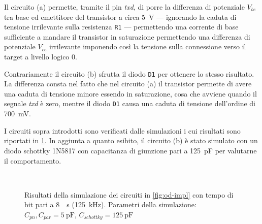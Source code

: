 Il circuito (a) permette, tramite il pin \textit{txd}, di porre la differenza di potenziale \(V_{be}\) tra base ed emettitore del transistor a circa \SI{5}{\volt} --- ignorando la caduta di tensione irrilevante sulla resistenza \texttt{R1} --- permettendo una corrente di base sufficiente a mandare il transistor in saturazione permettendo una differenza di potenziale \(V_{ce}\) irrilevante imponendo così la tensione sulla connessione verso il target a livello logico 0.

Contrariamente il circuito (b) sfrutta il diodo \texttt{D1} per ottenere lo stesso risultato. La differenza consta nel fatto che nel circuito (a) il transistor permette di avere una caduta di tensione minore essendo in saturazione, cosa che avviene quando il segnale \textit{txd} è zero, mentre il diodo \texttt{D1} causa una caduta di tensione dell'ordine di \SI{700}{\milli\volt}.

I circuiti sopra introdotti sono verificati dalle simulazioni i cui risultati sono riportati in \cref{graph:sim}. In aggiunta a quanto esibito, il circuito (b) è stato simulato con un diodo schottky 1N5817 con capacitanza di giunzione pari a \SI{125}{\pico\farad} per valutarne il comportamento.

\begin{figure}
    \centering
        \\
        \vfill
    \caption[]{Risultati della simulazione dei circuiti in \cref{fig:od-impl} con tempo di bit pari a \SI{8}{\text{\mu}\second} (\SI{125}{\kilo\hertz}). Parametri della simulazione: \(C_{pn}, C_{par} = \SI{5}{\pico\farad}\), \(C_{schottky} = \SI{125}{\pico\farad}\)}\label{graph:sim}
\end{figure}

